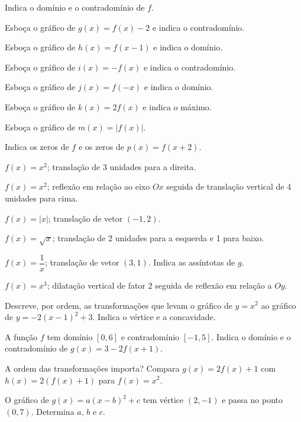 \documentclass[12pt]{article}
\begin{document}
\begin{exercicios}
  \item Indica o domínio e o contradomínio de $f$.
  \item Esboça o gráfico de $g(x) = f(x) - 2$ e indica o contradomínio.
  \item Esboça o gráfico de $h(x) = f(x - 1)$ e indica o domínio.
  \item Esboça o gráfico de $i(x) = -f(x)$ e indica o contradomínio.
  \item Esboça o gráfico de $j(x) = f(-x)$ e indica o domínio.
  \item Esboça o gráfico de $k(x) = 2f(x)$ e indica o máximo.
  \item Esboça o gráfico de $m(x) = |f(x)|$.
  \item Indica os zeros de $f$ e os zeros de $p(x) = f(x + 2)$.
\end{exercicios}

\begin{exercicios}
  \item $f(x) = x^2$; translação de 3 unidades para a direita.
  \item $f(x) = x^2$; reflexão em relação ao eixo $Ox$ seguida de translação vertical de 4 unidades para cima.
  \item $f(x) = |x|$; translação de vetor $(-1, 2)$.
  \item $f(x) = \sqrt{x}$; translação de 2 unidades para a esquerda e 1 para baixo.
  \item $f(x) = \dfrac{1}{x}$; translação de vetor $(3, 1)$. Indica as assíntotas de $g$.
  \item $f(x) = x^3$; dilatação vertical de fator 2 seguida de reflexão em relação a $Oy$.
\end{exercicios}

\begin{exercicios}
  \item Descreve, por ordem, as transformações que levam o gráfico de $y = x^2$ ao gráfico de $y = -2(x - 1)^2 + 3$. Indica o vértice e a concavidade.
  \item A função $f$ tem domínio $[0, 6]$ e contradomínio $[-1, 5]$. Indica o domínio e o contradomínio de $g(x) = 3 - 2f(x + 1)$.
  \item A ordem das transformações importa? Compara $g(x) = 2f(x) + 1$ com $h(x) = 2(f(x) + 1)$ para $f(x) = x^2$.
  \item O gráfico de $g(x) = a(x - b)^2 + c$ tem vértice $(2, -1)$ e passa no ponto $(0, 7)$. Determina $a$, $b$ e $c$.
\end{exercicios}
\end{document}
